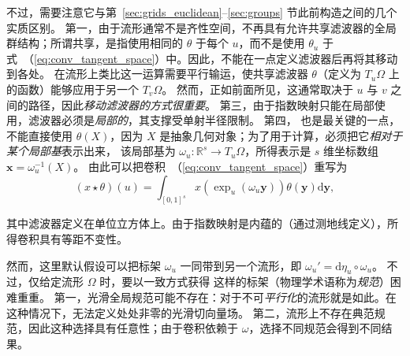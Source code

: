 不过，需要注意它与第~\ref{sec:grids_euclidean}--\ref{sec:groups} 节此前构造之间的几个实质区别。
%
第一，由于流形通常不是齐性空间，不再具有允许共享滤波器的全局群结构；所谓共享，是指使用相同的 $\theta$ 于每个 $u$，而不是使用 $\theta_u$ 于式~（\ref{eq:conv_tangent_space}）中。因此，不能在一点定义滤波器后再将其移动到各处。
%
在流形上类比这一运算需要平行输运，使共享滤波器 $\theta$（定义为 $T_u\Omega$ 上的函数）能够应用于另一个 $T_v\Omega$。
%
然而，正如前面所见，这通常取决于 $u$ 与 $v$ 之间的路径，因此{\em 移动滤波器的方式很重要}。%
%
%
第三，由于指数映射只能在局部使用，滤波器必须是{\em 局部的}，其支撑受单射半径限制。
%
第四，
也是最关键的一点，不能直接使用 $\theta(X)$，因为 $X$ 是抽象几何对象；为了用于计算，必须把它{\em 相对于某个局部基}表示出来，
该局部基为 $\omega_u : \mathbb{R}^s \rightarrow T_u\Omega$，所得表示是 $s$ 维坐标数组 $\mathbf{x} = \omega^{-1}_u(X)$。
%
由此可以把卷积~（\ref{eq:conv_tangent_space}）重写为
%
\begin{equation}
(x \star \theta)(u) = \int_{[0,1]^s} x(\exp_u (\omega_u \mathbf{y})) \theta(\mathbf{y}) \mathrm{d}\mathbf{y}, 
\label{eqn:conv_exp}
\end{equation}
%


其中滤波器定义在单位立方体上。由于指数映射是内蕴的（通过测地线定义），所得卷积具有等距不变性。


然而，这里默认假设可以把标架 $\omega_u$ 一同带到另一个流形，即 $\omega_u' = \mathrm{d}\eta_u \circ \omega_u$。
%
不过，仅给定流形 $\Omega$ 时，要以一致方式获得
这样的标架（物理学术语称为\emph{规范}）困难重重。
%
第一，光滑全局规范可能不存在：对于不可\emph{平行化}的流形就是如此。在这种情况下，无法定义处处非零的光滑切向量场。
%
%
第二，流形上不存在典范规范，因此这种选择具有任意性；由于卷积依赖于 $\omega$，选择不同规范会得到不同结果。

